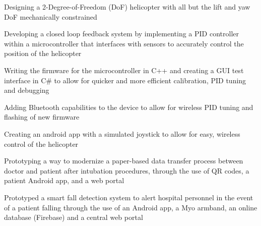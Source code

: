 \documentclass[]{aftab-resume}
\begin{document}
\begin{minipage}[t]{0.66\textwidth}
\begin{tightemize}
\item Designing a 2-Degree-of-Freedom (DoF) helicopter with all but the lift and yaw DoF mechanically constrained
\item Developing a closed loop feedback system by implementing a PID controller within a microcontroller that interfaces with sensors to accurately control the position of the helicopter
\item Writing the firmware for the microcontroller in C++ and creating a GUI test interface in C\# to allow for quicker and more efficient calibration, PID tuning and debugging
\item Adding Bluetooth capabilities to the device to allow for wireless PID tuning and flashing of new firmware
\item Creating an android app with a simulated joystick to allow for easy, wireless control of the helicopter 
\end{tightemize}

\sectionsep



\begin{tightemize}
\item Prototyping a way to modernize a paper-based data transfer process between doctor and patient after intubation
procedures, through the use of QR codes, a patient Android app, and a web portal
\end{tightemize}

\sectionsep



\begin{tightemize}
\item Prototyped a smart fall detection system to alert hospital personnel in the event of a patient falling through the use of an Android app, a Myo armband, an online database (Firebase) and a central web portal
\end{tightemize}

\sectionsep

\end{minipage} %
\end{document}
